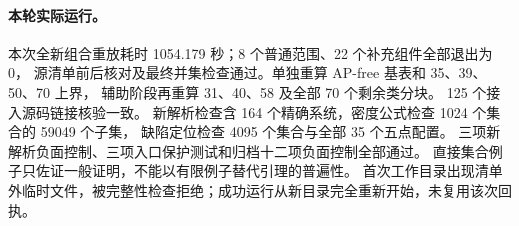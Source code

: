 \paragraph{本轮实际运行。}
本次全新组合重放耗时 1054.179 秒；8 个普通范围、22 个补充组件全部退出为 0，
源清单前后核对及最终并集检查通过。单独重算 AP-free 基表和 35、39、50、70 上界，
辅助阶段再重算 31、40、58 及全部 70 个剩余类分块。
125 个接入源码链接核验一致。
新解析检查含 164 个精确系统，密度公式检查 1024 个集合的 59049 个子集，
缺陷定位检查 4095 个集合与全部 35 个五点配置。
三项新解析负面控制、三项入口保护测试和归档十二项负面控制全部通过。
直接集合例子只佐证一般证明，不能以有限例子替代引理的普遍性。
首次工作目录出现清单外临时文件，被完整性检查拒绝；成功运行从新目录完全重新开始，未复用该次回执。
